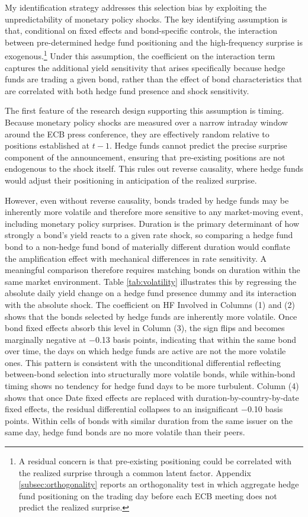 \documentclass[english, 11pt, oneside]{article}
\begin{document}
My identification strategy addresses this selection bias by exploiting the unpredictability of monetary policy shocks. The key identifying assumption is that, conditional on fixed effects and bond-specific controls, the interaction between pre-determined hedge fund positioning and the high-frequency surprise is exogenous.\footnote{A residual concern is that pre-existing positioning could be correlated with the realized surprise through a common latent factor. Appendix \ref{subsec:orthogonality} reports an orthogonality test in which aggregate hedge fund positioning on the trading day before each ECB meeting does not predict the realized surprise.} Under this assumption, the coefficient on the interaction term captures the additional yield sensitivity that arises specifically because hedge funds are trading a given bond, rather than the effect of bond characteristics that are correlated with both hedge fund presence and shock sensitivity.

The first feature of the research design supporting this assumption is timing. Because monetary policy shocks are measured over a narrow intraday window around the ECB press conference, they are effectively random relative to positions established at $t{-}1$. Hedge funds cannot predict the precise surprise component of the announcement, ensuring that pre-existing positions are not endogenous to the shock itself. This rules out reverse causality, where hedge funds would adjust their positioning in anticipation of the realized surprise.

However, even without reverse causality, bonds traded by hedge funds may be inherently more volatile and therefore more sensitive to any market-moving event, including monetary policy surprises. Duration is the primary determinant of how strongly a bond's yield reacts to a given rate shock, so comparing a hedge fund bond to a non-hedge fund bond of materially different duration would conflate the amplification effect with mechanical differences in rate sensitivity. A meaningful comparison therefore requires matching bonds on duration within the same market environment. Table \ref{tab:volatility} illustrates this by regressing the absolute daily yield change on a hedge fund presence dummy and its interaction with the absolute shock. The coefficient on HF Involved in Columns (1) and (2) shows that the bonds selected by hedge funds are inherently more volatile. Once bond fixed effects absorb this level in Column (3), the sign flips and becomes marginally negative at $-$0.13 basis points, indicating that within the same bond over time, the days on which hedge funds are active are not the more volatile ones. This pattern is consistent with the unconditional differential reflecting between-bond selection into structurally more volatile bonds, while within-bond timing shows no tendency for hedge fund days to be more turbulent. Column (4) shows that once Date fixed effects are replaced with duration-by-country-by-date fixed effects, the residual differential collapses to an insignificant $-$0.10 basis points. Within cells of bonds with similar duration from the same issuer on the same day, hedge fund bonds are no more volatile than their peers.
\end{document}
